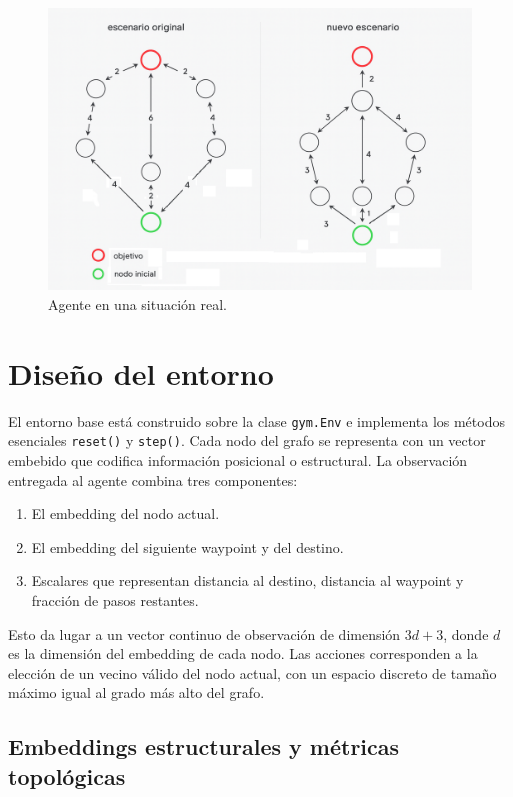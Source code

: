 \documentclass[11pt,a4paper]{article}
\begin{document}
\begin{figure}[htbp]
  \centering
  \includegraphics[width=.8\textwidth]{example.png}
  \caption{Agente en una situación real.}
  \label{fig:resultado}
\end{figure}

\section{Diseño del entorno}

El entorno base está construido sobre la clase \texttt{gym.Env} e implementa los métodos esenciales \texttt{reset()} y \texttt{step()}. Cada nodo del grafo se representa con un vector embebido que codifica información posicional o estructural. La observación entregada al agente combina tres componentes:

\begin{enumerate}
    \item El embedding del nodo actual.
    \item El embedding del siguiente waypoint y del destino.
    \item Escalares que representan distancia al destino, distancia al waypoint y fracción de pasos restantes.
\end{enumerate}

Esto da lugar a un vector continuo de observación de dimensión $3d + 3$, donde $d$ es la dimensión del embedding de cada nodo. Las acciones corresponden a la elección de un vecino válido del nodo actual, con un espacio discreto de tamaño máximo igual al grado más alto del grafo.

\subsection{Embeddings estructurales y métricas topológicas}
\end{document}
